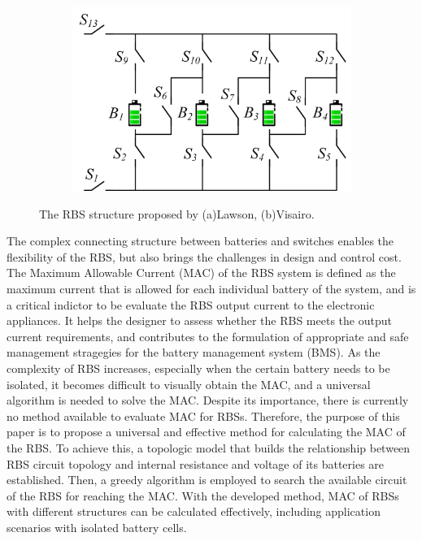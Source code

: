 \documentclass{article}
\begin{document}
\begin{figure}[htbp]
\begin{subfigure}[b]{0.2\textwidth}
       \caption{}
       \label{fig:arch-f}
   \end{subfigure}
   \hspace{0.05\textwidth}
   \begin{subfigure}[b]{0.45\textwidth}
       \includegraphics[width=\textwidth]{../attachments/arch-f.png}
       \caption{}
       \label{fig:arch-e}
   \end{subfigure}
    \caption{The RBS structure proposed by (a)Lawson\cite{lawsonSoftwareConfigurableBattery2012}, (b)Visairo\cite{visairoReconfigurableBatteryPack2008}.}
    \label{fig:arch}
\end{figure}

The complex connecting structure between batteries and switches enables the flexibility of the RBS, but also brings the challenges in design and control cost.
The Maximum Allowable Current (MAC) of the RBS system is defined as the maximum current that is allowed for each individual battery of the system, and is a critical indictor to be evaluate the RBS output current to the electronic appliances.
It helps the designer to assess whether the RBS meets the output current requirements, and contributes to the formulation of appropriate and safe management stragegies for the battery management system (BMS).
As the complexity of RBS increases, especially when the certain battery needs to be isolated, it becomes difficult to visually obtain the MAC, and a universal algorithm is needed to solve the MAC.
Despite its importance, there is currently no method available to evaluate MAC for RBSs.
Therefore, the purpose of this paper is to propose a universal and effective method for calculating the MAC of the RBS.
To achieve this, a topologic model that builds the relationship between RBS circuit topology and internal resistance and voltage of its batteries are established.
Then, a greedy algorithm is employed to search the available circuit of the RBS for reaching the MAC.
With the developed method, MAC of RBSs with different structures can be calculated effectively, including application scenarios with isolated battery cells.
\end{document}

